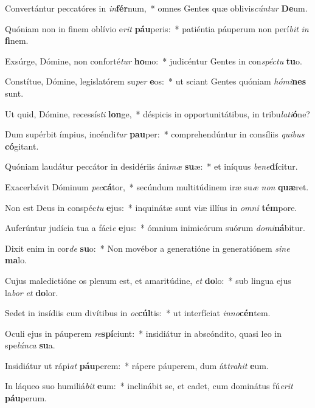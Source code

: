 \item Convertántur peccatóres in \textit{in}\textbf{fér}num,~* omnes Gentes quæ oblivis\textit{cún}\textit{tur} \textbf{De}um.
\item Quóniam non in finem oblívio e\textit{rit} \textbf{páu}peris:~* patiéntia páuperum non perí\textit{bit} \textit{in} \textbf{fi}nem.
\item Exsúrge, Dómine, non conforté\textit{tur} \textbf{ho}mo:~* judicéntur Gentes in con\textit{spéc}\textit{tu} \textbf{tu}o.
\item Constítue, Dómine, legislatórem su\textit{per} \textbf{e}os:~* ut sciant Gentes quóniam \textit{hó}\textit{mi}\textbf{nes} sunt.
\item Ut quid, Dómine, recessís\textit{ti} \textbf{lon}ge,~* déspicis in opportunitátibus, in tribu\textit{la}\textit{ti}\textbf{ó}ne?
\item Dum supérbit ímpius, incéndi\textit{tur} \textbf{pau}per:~* comprehendúntur in consíliis \textit{qui}\textit{bus} \textbf{có}gitant.
\item Quóniam laudátur peccátor in desidériis áni\textit{mæ} \textbf{su}æ:~* et iníquus \textit{be}\textit{ne}\textbf{dí}citur.
\item Exacerbávit Dóminum \textit{pec}\textbf{cá}tor,~* secúndum multitúdinem iræ su\textit{æ} \textit{non} \textbf{quæ}ret.
\item Non est Deus in conspéc\textit{tu} \textbf{e}jus:~* inquinátæ sunt viæ illíus in \textit{om}\textit{ni} \textbf{tém}pore.
\item Auferúntur judícia tua a fáci\textit{e} \textbf{e}jus:~* ómnium inimicórum suórum \textit{do}\textit{mi}\textbf{ná}bitur.
\item Dixit enim in cor\textit{de} \textbf{su}o:~* Non movébor a generatióne in generatiónem \textit{si}\textit{ne} \textbf{ma}lo.
\item Cujus maledictióne os plenum est, et amaritúdine, \textit{et} \textbf{do}lo:~* sub lingua ejus la\textit{bor} \textit{et} \textbf{do}lor.
\item Sedet in insídiis cum divítibus in \textit{oc}\textbf{cúl}tis:~* ut interfíciat \textit{in}\textit{no}\textbf{cén}tem.
\item Oculi ejus in páuperem \textit{re}\textbf{spí}ciunt:~* insidiátur in abscóndito, quasi leo in spe\textit{lún}\textit{ca} \textbf{su}a.
\item Insidiátur ut rápi\textit{at} \textbf{páu}perem:~* rápere páuperem, dum át\textit{tra}\textit{hit} \textbf{e}um.
\item In láqueo suo humiliá\textit{bit} \textbf{e}um:~* inclinábit se, et cadet, cum dominátus fú\textit{e}\textit{rit} \textbf{páu}perum.
